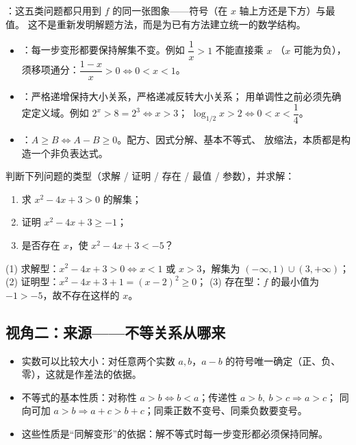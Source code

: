 \begin{explore}
：这五类问题都只用到 $f$ 的同一张图象——符号（在 $x$ 轴上方还是下方）与最值。
这不是重新发明解题方法，而是为已有方法建立统一的数学结构。

\begin{itemize}
  \item {}：每一步变形都要保持解集不变。例如 $\dfrac1x>1$ 不能直接乘 $x$
        （$x$ 可能为负），须移项通分：$\dfrac{1-x}{x}>0\iff 0<x<1$。
  \item {}：严格递增保持大小关系，严格递减反转大小关系；
        用单调性之前必须先确定定义域。例如 $2^x>8=2^3\iff x>3$；
        $\log_{1/2}x>2\iff 0<x<\dfrac14$。
  \item {}：$A\geq B\iff A-B\geq0$。配方、因式分解、基本不等式、
        放缩法，本质都是构造一个非负表达式。
\end{itemize}

\begin{problem}
判断下列问题的类型（求解 / 证明 / 存在 / 最值 / 参数），并求解：
\begin{enumerate}
  \item 求 $x^2-4x+3>0$ 的解集；
  \item 证明 $x^2-4x+3\geq-1$；
  \item 是否存在 $x$，使 $x^2-4x+3<-5$？
\end{enumerate}
\end{problem}
\begin{solution}
(1) 求解型：$x^2-4x+3>0\iff x<1$ 或 $x>3$，解集为 $(-\infty,1)\cup(3,+\infty)$；
(2) 证明型：$x^2-4x+3+1=(x-2)^2\geq0$；
(3) 存在型：$f$ 的最小值为 $-1>-5$，故不存在这样的 $x$。
\end{solution}


\subsection{视角二：来源——不等关系从哪来}

\begin{itemize}
  \item 实数可以比较大小：对任意两个实数 $a,b$，$a-b$ 的符号唯一确定（正、负、零），这就是作差法的依据。
  \item 不等式的基本性质：对称性 $a>b\iff b<a$；传递性 $a>b,\ b>c\Rightarrow a>c$；
        同向可加 $a>b\Rightarrow a+c>b+c$；同乘正数不变号、同乘负数要变号。
  \item 这些性质是“同解变形”的依据：解不等式时每一步变形都必须保持同解。
\end{itemize}


\end{explore}
